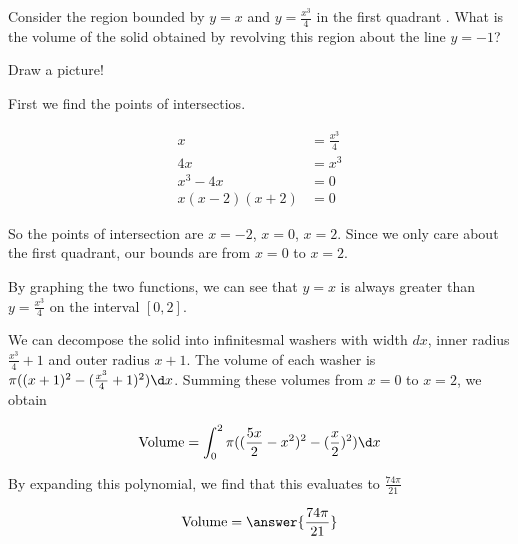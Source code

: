 \documentclass{ximera}
\author{Steven Gubkin}
\begin{document}
\begin{exercise}



Consider the region bounded by $y = x$ and $y=\frac{x^3}{4}$ in the first quadrant .  What is the volume of the solid obtained by revolving this region about the line $y=-1$?

\begin{hint}
	Draw a picture!
\end{hint}

\begin{hint}
	First we find the points of intersectios.
	
	\begin{align*}
	x&= \frac{x^3}{4}\\
	4x &= x^3\\
	x^3-4x &=0\\
	x(x-2)(x+2) &=0
	\end{align*}

	So the points of intersection are $x=-2$, $x=0$, $x=2$.  Since we only care about the first quadrant, our bounds are from $x=0$ to $x=2$.
\end{hint}

\begin{hint}
	By graphing the two functions, we can see that $y=x$ is always greater than $y=\frac{x^3}{4}$ on the interval $[0,2]$.
\end{hint}

\begin{hint}
	We can decompose the solid into infinitesmal washers with width $dx$, inner radius $\frac{x^3}{4}+1$ and outer radius $x+1$. The volume of each washer is $\pi((x+1)^2-(\frac{x^3}{4}+1)^2)\d x$.  Summing these volumes from $x=0$ to $x=2$, we obtain

	\[
	\textrm{Volume} = \int_0^2 \pi((\frac{5x}{2}-x^2)^2-(\frac{x}{2})^2) \d x
	\]
\end{hint}


\begin{hint}
	By expanding this polynomial, we find that this evaluates to $\frac{74\pi}{21}$
\end{hint}

\begin{prompt}
	\[
		\textrm{Volume} = \answer{\frac{74\pi}{21}}
	\]
\end{prompt}

\end{exercise}
\end{document}
